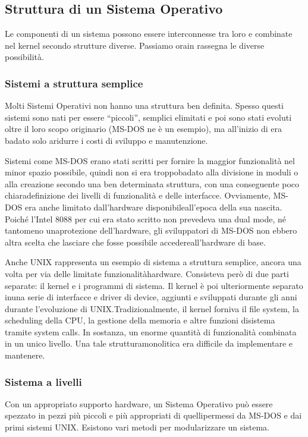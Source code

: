 \documentclass[a4paper]{article}
\begin{document}
\subsection{Struttura di un Sistema Operativo}
Le componenti di un sistema possono essere interconnesse tra loro e combinate nel kernel secondo strutture diverse. Passiamo orain rassegna le diverse possibilità.

\subsubsection{Sistemi a struttura semplice}
Molti Sistemi Operativi non hanno una struttura ben definita. Spesso questi sistemi sono nati per essere ``piccoli'', semplici elimitati e poi sono stati evoluti oltre il loro scopo originario (MS-DOS ne è un esempio), ma all'inizio di era badato solo aridurre i costi di sviluppo e manutenzione.

Sistemi come MS-DOS erano stati scritti per fornire la maggior funzionalità nel minor spazio possibile, quindi non si era troppobadato alla divisione in moduli o alla creazione secondo una ben determinata struttura, con una conseguente poco chiaradefinizione dei livelli di funzionalità e delle interfacce. Ovviamente, MS-DOS era anche limitato dall'hardware disponibileall'epoca della sua nascita. Poiché l'Intel 8088 per cui era stato scritto non prevedeva una dual mode, né tantomeno unaprotezione dell'hardware, gli sviluppatori di MS-DOS non ebbero altra scelta che lasciare che fosse possibile accedereall'hardware di base.

Anche UNIX rappresenta un esempio di sistema a struttura semplice, ancora una volta per via delle limitate funzionalitàhardware. Consisteva però di due parti separate: il kernel e i programmi di sistema. Il kernel è poi ulteriormente separato inuna serie di interfacce e driver di device, aggiunti e sviluppati durante gli anni durante l'evoluzione di UNIX.Tradizionalmente, il kernel forniva il file system, la scheduling della CPU, la gestione della memoria e altre funzioni disistema tramite system calls. In sostanza, un enorme quantità di funzionalità combinata in un unico livello. Una tale strutturamonolitica era difficile da implementare e mantenere.

\subsubsection{Sistema a livelli}
Con un appropriato supporto hardware, un Sistema Operativo può essere spezzato in pezzi più piccoli e più appropriati di quellipermessi da MS-DOS e dai primi sistemi UNIX. Esistono vari metodi per modularizzare un sistema.
\end{document}
